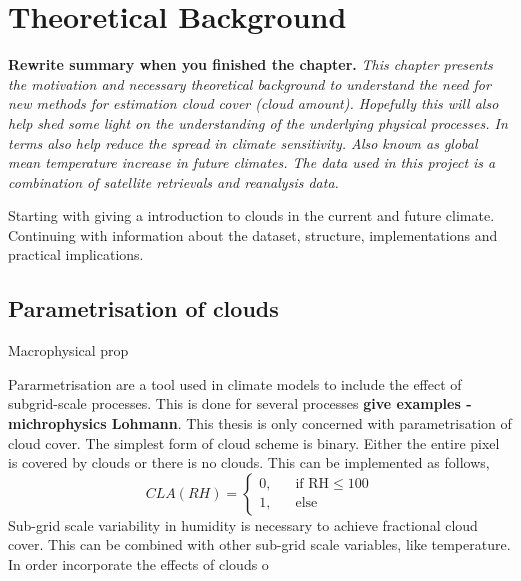 \setcounter{chapter}{1} 
\chapter{Theoretical Background} \label{ch:theoretical_back}
\textbf{Rewrite summary when you finished the chapter.}
\textit{This chapter presents the motivation and necessary theoretical background  to understand the need for new methods for estimation cloud cover \textit{(cloud amount)}. Hopefully this will also help shed some light on the understanding of the underlying physical processes. In terms also help reduce the spread in climate sensitivity. Also known as global mean temperature increase in future climates. The data used in this project is a combination of satellite retrievals and reanalysis data.}

Starting with giving a introduction to clouds in the current and future climate. Continuing with information about the dataset, structure, implementations and practical implications.


\section{Parametrisation of clouds} \label{sec:param_clouds}
Macrophysical prop


Pararmetrisation are a tool used in climate models to include the effect of subgrid-scale processes. This is done for several processes \textbf{give examples - michrophysics Lohmann}. This thesis is only concerned with parametrisation of cloud cover. The simplest form of cloud scheme is binary. Either the entire pixel is covered by clouds or there is no clouds. This can be implemented as follows,
\begin{equation} \label{eq:binary_param_clouds}
    CLA\left(RH\right) = 
     \begin{cases}
       \text{0,} &\quad\text{if RH}\le100\\
       \text{1,} &\quad\text{else}
     \end{cases}
\end{equation}
Sub-grid scale variability in humidity is necessary to achieve fractional cloud cover. This can be combined with other sub-grid scale variables, like temperature. In order incorporate the effects of clouds o  

